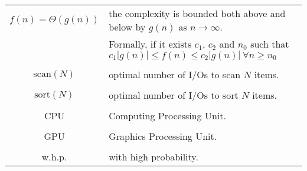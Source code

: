 {\begin{tabular}{cp{130mm}}
  $f(n) = \Theta(g(n))$ & the complexity is bounded both above and below by $g(n)$ as $n \rightarrow \infty$. \\
  & Formally, if it exists $c_{1}$, $c_{2}$ and $n_{0}$ such that $c_{1}|g(n)| \leq f(n) \leq c_{2}|g(n)| ~ \forall n \geq n_{0}$ \\
  & \\
  $ \text{scan}(N)$ & optimal number of I/Os to scan $N$ items. \\
  & \\
  $ \text{sort}(N)$ & optimal number of I/Os to sort $N$ items. \\
  & \\
  CPU & Computing Processing Unit. \\
  & \\
  GPU & Graphics Processing Unit. \\
  & \\
  w.h.p. & with high probability. \\
\end{tabular}

}
\clearpage


